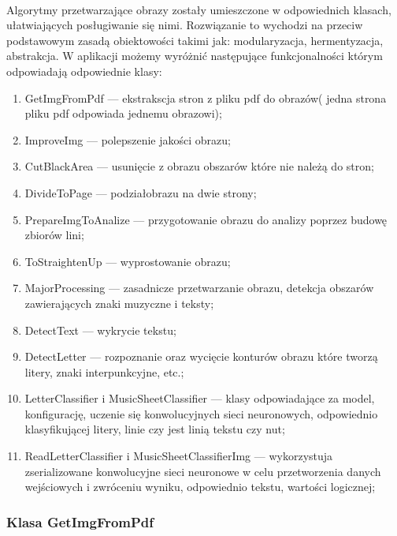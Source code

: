 \documentclass[a4paper,12pt]{article}
\begin{document}
		\paragraph{} Algorytmy  przetwarzające obrazy zostały umieszczone w odpowiednich klasach, ułatwiających posługiwanie się nimi. Rozwiązanie to wychodzi na przeciw podstawowym zasadą obiektowości takimi jak: modularyzacja, hermentyzacja, abstrakcja. W aplikacji możemy wyróżnić następujące funkcjonalności którym odpowiadają odpowiednie klasy:
		\begin{spacing}{1}
    		\begin{enumerate}
    			\item GetImgFromPdf --- ekstrakscja stron z pliku pdf do obrazów( jedna strona pliku pdf odpowiada jednemu obrazowi);
    			\item ImproveImg --- polepszenie jakości obrazu;
    			\item CutBlackArea --- usunięcie z obrazu obszarów które nie należą do stron;
    			\item DivideToPage --- podzia\l obrazu na dwie strony;
    			\item PrepareImgToAnalize --- przygotowanie obrazu do analizy poprzez budowę zbiorów lini;
    			\item ToStraightenUp --- wyprostowanie obrazu;
    			\item MajorProcessing --- zasadnicze przetwarzanie obrazu, detekcja obszarów zawierających znaki muzyczne i teksty; 
    			\item DetectText --- wykrycie tekstu;
    			\item DetectLetter --- rozpoznanie oraz wycięcie konturów obrazu które tworzą litery, znaki interpunkcyjne, etc.;
    			\item LetterClassifier i MusicSheetClassifier --- klasy odpowiadające za model, konfigurację, uczenie się konwolucyjnych sieci neuronowych, odpowiednio klasyfikującej litery, linie czy jest linią tekstu czy nut;
    			\item ReadLetterClassifier i MusicSheetClassifierImg --- wykorzystuja zserializowane konwolucyjne sieci neuronowe w celu przetworzenia danych wejściowych i zwróceniu wyniku, odpowiednio tekstu, wartości logicznej;
    		\end{enumerate} 
        \end{spacing}
        
	\subsubsection{Klasa GetImgFromPdf}
\end{document}
